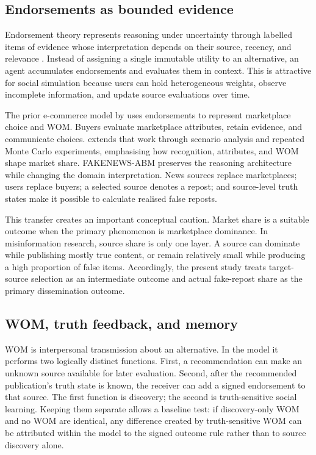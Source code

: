 \subsection{Endorsements as bounded evidence}

Endorsement theory represents reasoning under uncertainty through labelled items of evidence whose interpretation depends on their source, recency, and relevance \citep{cohen1985}. Instead of assigning a single immutable utility to an alternative, an agent accumulates endorsements and evaluates them in context. This is attractive for social simulation because users can hold heterogeneous weights, observe incomplete information, and update source evaluations over time.

The prior e-commerce model by \citet{teran2022} uses endorsements to represent marketplace choice and WOM. Buyers evaluate marketplace attributes, retain evidence, and communicate choices. \citet{teran2024} extends that work through scenario analysis and repeated Monte Carlo experiments, emphasising how recognition, attributes, and WOM shape market share. FAKENEWS-ABM preserves the reasoning architecture while changing the domain interpretation. News sources replace marketplaces; users replace buyers; a selected source denotes a repost; and source-level truth states make it possible to calculate realised false reposts.

This transfer creates an important conceptual caution. Market share is a suitable outcome when the primary phenomenon is marketplace dominance. In misinformation research, source share is only one layer. A source can dominate while publishing mostly true content, or remain relatively small while producing a high proportion of false items. Accordingly, the present study treats target-source selection as an intermediate outcome and actual fake-repost share as the primary dissemination outcome.

\subsection{WOM, truth feedback, and memory}

WOM is interpersonal transmission about an alternative. In the model it performs two logically distinct functions. First, a recommendation can make an unknown source available for later evaluation. Second, after the recommended publication's truth state is known, the receiver can add a signed endorsement to that source. The first function is discovery; the second is truth-sensitive social learning. Keeping them separate allows a baseline test: if discovery-only WOM and no WOM are identical, any difference created by truth-sensitive WOM can be attributed within the model to the signed outcome rule rather than to source discovery alone.

